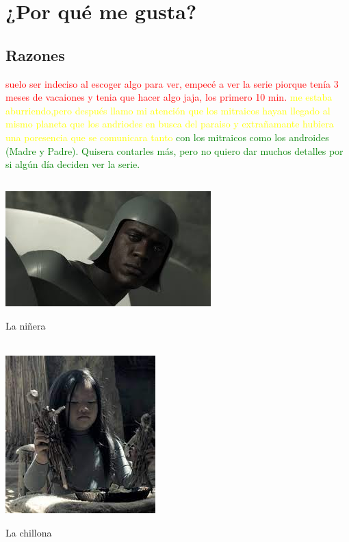 \documentclass[ä5paper, 11pt]{article}
\begin{document}
    \section*{¿Por qué me gusta?}
        \subsection*{Razones}
          \textcolor{red}{suelo ser indeciso al escoger algo para ver, empecé a ver la serie piorque tenía 3 meses de vacaiones y tenia que hacer algo jaja, los primero 10 min.} \textcolor{yellow}{ me estaba aburriendo,pero después llamo mi atención que los mitraicos hayan llegado al mismo planeta que los andriodes en busca del paraiso y extrañamante hubiera una poresencia que se comunicara tanto}\textcolor{green}{ con los mitraicos como los androides (Madre y Padre). Quisera contarles más, pero no quiero dar muchos detalles por si algún día deciden ver la serie.}
        \subsection*{}\includegraphics[scale=.7,rotate=-18]{Padre.jpg}\caption{La niñera}\\
         \includegraphics[scale=.4,rotate=8]{Vita, la chillona.jpg}{\caption{La chillona}}
         
           
         
\end{document}
